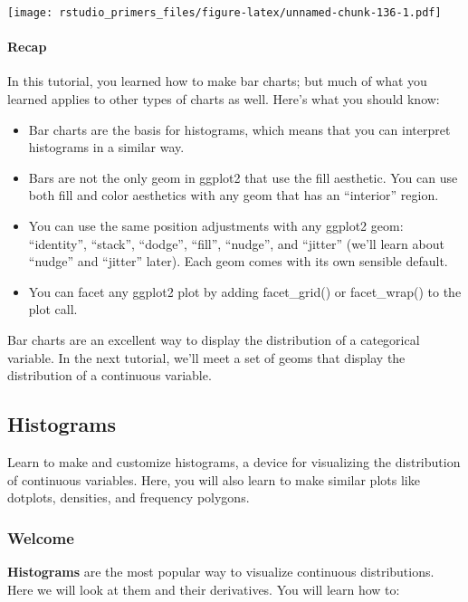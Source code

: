 \documentclass[
]{article}
\providecommand{\tightlist}{%
  \setlength{\itemsep}{0pt}\setlength{\parskip}{0pt}}
\begin{document}
\texttt{[image: rstudio\_primers\_files/figure-latex/unnamed-chunk-136-1.pdf]}

\hypertarget{recap-4}{%
\paragraph{Recap}\label{recap-4}}

In this tutorial, you learned how to make bar charts; but much of what
you learned applies to other types of charts as well. Here's what you
should know:

\begin{itemize}
\tightlist
\item
  Bar charts are the basis for histograms, which means that you can
  interpret histograms in a similar way.
\item
  Bars are not the only geom in ggplot2 that use the fill aesthetic. You
  can use both fill and color aesthetics with any geom that has an
  ``interior'' region.
\item
  You can use the same position adjustments with any ggplot2 geom:
  ``identity'', ``stack'', ``dodge'', ``fill'', ``nudge'', and
  ``jitter'' (we'll learn about ``nudge'' and ``jitter'' later). Each
  geom comes with its own sensible default.
\item
  You can facet any ggplot2 plot by adding facet\_grid() or
  facet\_wrap() to the plot call.
\end{itemize}

Bar charts are an excellent way to display the distribution of a
categorical variable. In the next tutorial, we'll meet a set of geoms
that display the distribution of a continuous variable.

\hypertarget{histograms}{%
\subsection{Histograms}\label{histograms}}

Learn to make and customize histograms, a device for visualizing the
distribution of continuous variables. Here, you will also learn to make
similar plots like dotplots, densities, and frequency polygons.

\hypertarget{welcome-7}{%
\subsubsection{Welcome}\label{welcome-7}}

\textbf{Histograms} are the most popular way to visualize continuous
distributions. Here we will look at them and their derivatives. You will
learn how to:
\end{document}
